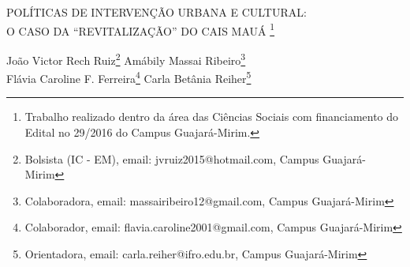 \documentclass[article,12pt,onesidea,4paper,english,brazil]{abntex2}
\begin{document}
	
	
	\frenchspacing 
	
	\begin{center}
		\Large POLÍTICAS DE INTERVENÇÃO URBANA E CULTURAL: 		
\\		\LARGE O CASO DA
		“REVITALIZAÇÃO” DO CAIS MAUÁ \footnote{Trabalho realizado dentro da área das Ciências Sociais com financiamento do Edital no 29/2016 do
			Campus Guajará-Mirim.}
		
		\normalsize
		João Victor Rech Ruiz\footnote{Bolsista (IC - EM), email: jvruiz2015@hotmail.com, Campus Guajará-Mirim} 
		Amábily Massai Ribeiro\footnote{Colaboradora, email: massairibeiro12@gmail.com, Campus Guajará-Mirim} \\
		Flávia Caroline F. Ferreira\footnote{Colaborador, email: flavia.caroline2001@gmail.com, Campus Guajará-Mirim} 
		Carla Betânia Reiher\footnote{Orientadora, email: carla.reiher@ifro.edu.br, Campus Guajará-Mirim} 
	\end{center}
	
\end{document}
